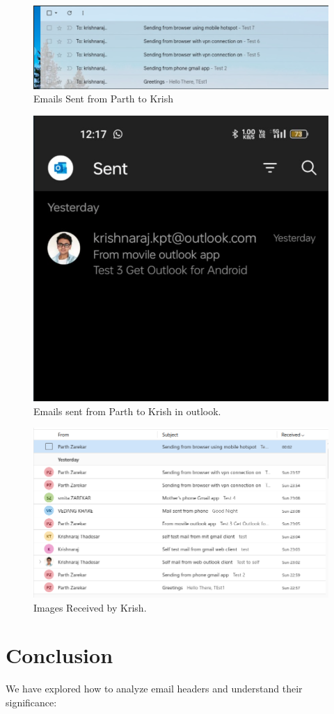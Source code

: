 \documentclass[11pt]{article}
\begin{document}
\begin{figure}[H]
    \centering
    \includegraphics[width=.45\textwidth]{parth gmail sent.png}
    \caption{Emails Sent from Parth to Krish}
\end{figure}
    

\begin{figure}[H]
    \centering
    \includegraphics[width=.45\textwidth]{parth outlook sent.png}
    \caption{Emails sent from Parth to Krish in outlook.}
\end{figure}


\begin{figure}[H]
    \centering
    \includegraphics[width=.45\textwidth]{krish outlook received.png}
    \caption{Images Received by Krish. }
\end{figure}

% 

\section{Conclusion}
We have explored how to analyze email headers and understand their significance:
\end{document}
